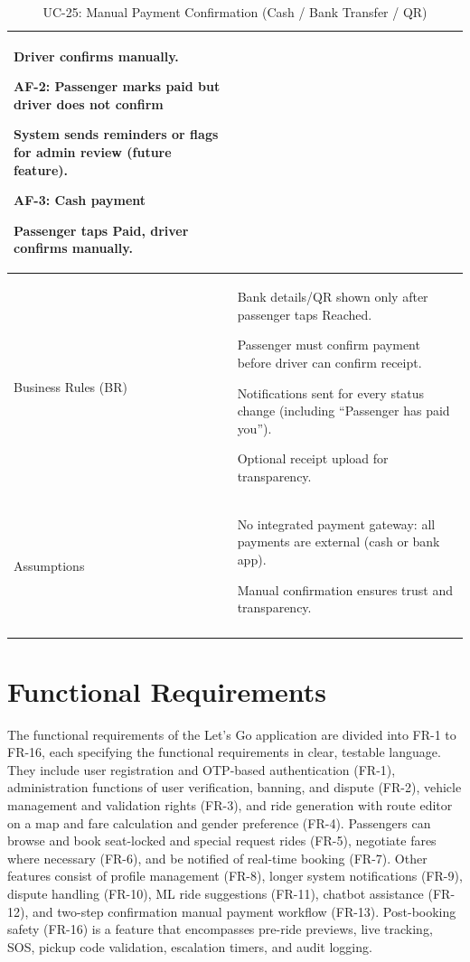 \begin{longtable}{|p{3.5cm}|p{12cm}|}
Driver confirms manually.

\textbf{AF-2: Passenger marks paid but driver does not confirm}

System sends reminders or flags for admin review (future feature).

\textbf{AF-3: Cash payment}

Passenger taps Paid, driver confirms manually. \\
\hline
Business Rules (BR) &
Bank details/QR shown only after passenger taps Reached.

Passenger must confirm payment before driver can confirm receipt.

Notifications sent for every status change (including “Passenger has paid you”).

Optional receipt upload for transparency. \\
\hline
Assumptions &
No integrated payment gateway: all payments are external (cash or bank app).

Manual confirmation ensures trust and transparency. \\
\hline
\caption{UC-25: Manual Payment Confirmation (Cash / Bank Transfer / QR)}
\end{longtable}

\section{Functional Requirements}

The functional requirements of the Let's Go application are divided into FR-1 to FR-16, each specifying the functional requirements in clear, testable language. They include user registration and OTP-based authentication (FR-1), administration functions of user verification, banning, and dispute (FR-2), vehicle management and validation rights (FR-3), and ride generation with route editor on a map and fare calculation and gender preference (FR-4). Passengers can browse and book seat-locked and special request rides (FR-5), negotiate fares where necessary (FR-6), and be notified of real-time booking (FR-7). Other features consist of profile management (FR-8), longer system notifications (FR-9), dispute handling (FR-10), ML ride suggestions (FR-11), chatbot assistance (FR-12), and two-step confirmation manual payment workflow (FR-13). Post-booking safety (FR-16) is a feature that encompasses pre-ride previews, live tracking, SOS, pickup code validation, escalation timers, and audit logging.

